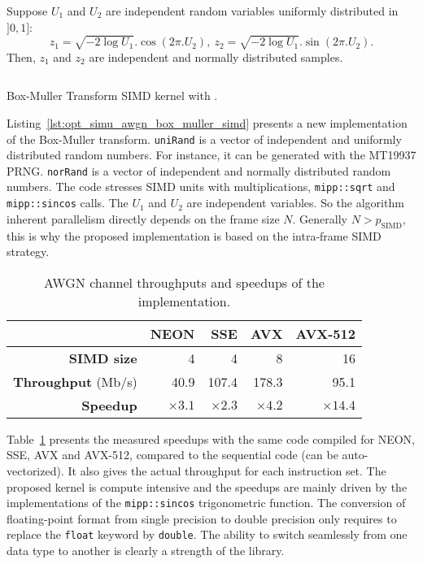 Suppose $U_1$ and $U_2$ are independent random variables uniformly distributed
in $]0, 1]$:
\begin{equation*}
  z_1 = \sqrt{-2 \log{U_1}}.\cos(2\pi.U_2),~z_2 = \sqrt{-2 \log{U_1}}.\sin(2\pi.U_2).
\end{equation*}
Then, $z_1$ and $z_2$ are independent and normally distributed samples.

\begin{listing}[htp]
  \inputminted[frame=lines,linenos]{C++}{\curChapter/src/simu/awgn/box_muller_simd.cpp}
  \caption{Box-Muller Transform SIMD kernel with \MIPP.}
  \label{lst:opt_simu_awgn_box_muller_simd}
\end{listing}

Listing~\ref{lst:opt_simu_awgn_box_muller_simd} presents a new \MIPP
implementation of the Box-Muller transform. \verb|uniRand| is a vector of
independent and uniformly distributed random numbers. For instance, it can be
generated with the MT19937 PRNG. \verb|norRand| is a vector of independent and
normally distributed random numbers. The code stresses SIMD units with
multiplications, \verb|mipp::sqrt| and \verb|mipp::sincos| calls. The $U_1$ and
$U_2$ are independent variables. So the algorithm inherent parallelism directly
depends on the frame size $N$. Generally $N > p_\text{SIMD}$, this is why the
proposed implementation is based on the intra-frame SIMD strategy.

\begin{table}[htp]
  \centering
  \caption{AWGN channel throughputs and speedups of the \MIPP implementation.}
  \label{lst:opt_simu_awgn_speedup}
  \begin{tabular}{r | r  r r r}
                             & \textbf{NEON} & \textbf{SSE} & \textbf{AVX} & \textbf{AVX-512} \\ \hline \hline
  \textbf{SIMD size}         & 4             & 4            & 8            & 16               \\ %
  \textbf{Throughput} (Mb/s) & 40.9          & 107.4        & 178.3        & 95.1             \\ %
  \textbf{Speedup}           & $\times 3.1$  & $\times 2.3$ & $\times 4.2$ & $\times 14.4$    \\
  \end{tabular}
\end{table}

\newpage
Table~\ref{lst:opt_simu_awgn_speedup} presents the measured speedups with the
same \MIPP code compiled for NEON, SSE, AVX and AVX-512, compared to the
sequential code (can be auto-vectorized). It also gives the actual throughput
for each instruction set. The proposed kernel is compute intensive and the
speedups are mainly driven by the \MIPP implementations of the
\verb|mipp::sincos| trigonometric function. The conversion of floating-point
format from single precision to double precision only requires to replace the
\verb|float| keyword by \verb|double|. The ability to switch seamlessly from one
data type to another is clearly a strength of the \MIPP library.

